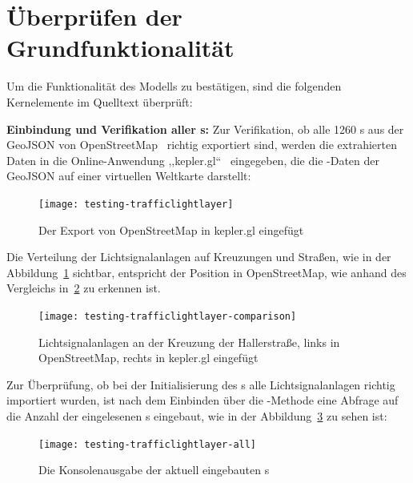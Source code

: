 %


\section{Überprüfen der Grundfunktionalität}\label{sec:testing}

Um die Funktionalität des Modells zu bestätigen, sind die folgenden Kernelemente im Quelltext überprüft:

\textbf{Einbindung und Verifikation aller s:} Zur Verifikation, ob alle 1260 s aus der GeoJSON von OpenStreetMap~\cite{OSF2004} richtig exportiert sind, werden die extrahierten Daten in die Online-Anwendung ,,kepler.gl``~\cite{Kepler2018} eingegeben, die die -Daten der GeoJSON auf einer virtuellen Weltkarte darstellt:

\begin{figure}[h]
    \centering
    \texttt{[image: testing-trafficlightlayer]}~\caption{Der Export von OpenStreetMap in kepler.gl eingefügt}
    \label{fig:traffic-light-spawns}
\end{figure}

Die Verteilung der Lichtsignalanlagen auf Kreuzungen und Straßen, wie in der Abbildung~\ref{fig:traffic-light-spawns} sichtbar, entspricht der Position in OpenStreetMap, wie anhand des Vergleichs in~\ref{fig:traffic-light-spawns-comparison} zu erkennen ist.

\begin{figure}[h]
    \centering
    \texttt{[image: testing-trafficlightlayer-comparison]}~\caption{Lichtsignalanlagen an der Kreuzung der Hallerstraße, links in OpenStreetMap, rechts in kepler.gl eingefügt}
    \label{fig:traffic-light-spawns-comparison}
\end{figure}

Zur Überprüfung, ob bei der Initialisierung des s alle Lichtsignalanlagen richtig importiert wurden, ist nach dem Einbinden über die -Methode eine Abfrage auf die Anzahl der eingelesenen s eingebaut, wie in der Abbildung~\ref{fig:all-traffic-lights} zu sehen ist:

\begin{figure}[h]
    \centering
    \texttt{[image: testing-trafficlightlayer-all]}~\caption{Die Konsolenausgabe der aktuell eingebauten s}
    \label{fig:all-traffic-lights}
\end{figure}

